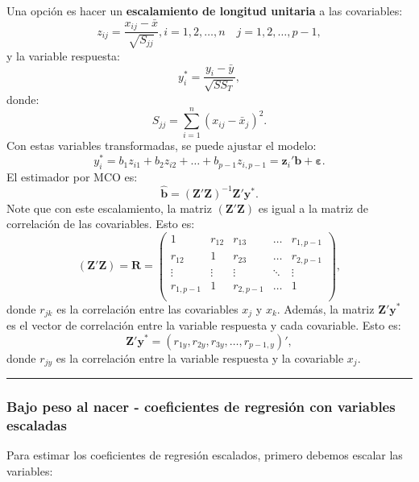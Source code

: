 \documentclass[
]{article}
\begin{document}
Una opción es hacer un \textbf{escalamiento de longitud unitaria} a las covariables:
\[
z_{ij} = \frac{x_{ij}-\bar{x}}{\sqrt{S_{jj}}}, i=1,2,\ldots,n \quad j=1,2,\ldots,p-1,
\]
y la variable respuesta:
\[
y_{i}^{*} = \frac{y_{i}-\bar{y}}{\sqrt{SS_{T}}},
\]
donde:
\[
S_{jj} = \sum_{i=1}^{n}(x_{ij} - \bar{x}_{j})^{2}.
\]
Con estas variables transformadas, se puede ajustar el modelo:
\[
y_{i}^{*} = b_{1}z_{i1} + b_{2}z_{i2} + \ldots + b_{p-1}z_{i,p-1} = \boldsymbol z_{i}'\boldsymbol b+ \boldsymbol \varepsilon.
\]
El estimador por MCO es:
\[
\widehat{\boldsymbol b}= (\boldsymbol Z'\boldsymbol Z)^{-1}\boldsymbol Z'\boldsymbol y^{*}.
\]
Note que con este escalamiento, la matriz \((\boldsymbol Z'\boldsymbol Z)\) es igual a la matriz de correlación de las covariables. Esto es:
\[
(\boldsymbol Z'\boldsymbol Z) = \boldsymbol R= \begin{pmatrix}
1 & r_{12} & r_{13} & \ldots & r_{1,p-1} \\
r_{12} & 1 & r_{23} & \ldots & r_{2,p-1} \\
\vdots & \vdots & \vdots & \ddots & \vdots \\
r_{1,p-1} & 1 & r_{2,p-1} & \ldots & 1 \\
\end{pmatrix},
\]
donde \(r_{jk}\) es la correlación entre las covariables \(x_{j}\) y \(x_{k}\). Además, la matriz \(\boldsymbol Z'\boldsymbol y^{*}\) es el vector de correlación entre la variable respuesta y cada covariable. Esto es:
\[
\boldsymbol Z'\boldsymbol y^{*} = (r_{1y},r_{2y},r_{3y},\ldots,r_{p-1,y})',
\]
donde \(r_{jy}\) es la correlación entre la variable respuesta y la covariable \(x_j\).

\rule{\textwidth}{0.4pt}

\hypertarget{bajo-peso-al-nacer---coeficientes-de-regresiuxf3n-con-variables-escaladas}{%
\subsubsection*{Bajo peso al nacer - coeficientes de regresión con variables escaladas}\label{bajo-peso-al-nacer---coeficientes-de-regresiuxf3n-con-variables-escaladas}}

Para estimar los coeficientes de regresión escalados, primero debemos escalar las variables:
\end{document}

